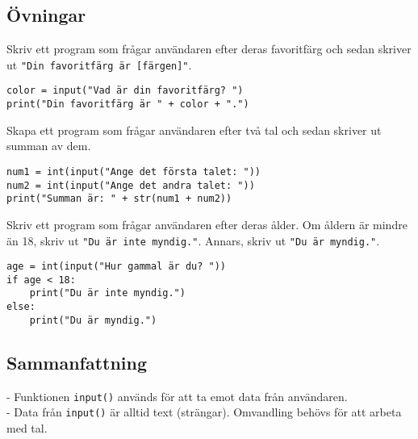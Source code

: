 \subsection{Övningar}
\begin{exercise}
Skriv ett program som frågar användaren efter deras favoritfärg och sedan skriver ut \texttt{"Din favoritfärg är [färgen]"}. 
\end{exercise}

\begin{solution}
\begin{lstlisting}
color = input("Vad är din favoritfärg? ")
print("Din favoritfärg är " + color + ".")
\end{lstlisting}
\end{solution}

\begin{exercise}
Skapa ett program som frågar användaren efter två tal och sedan skriver ut summan av dem.
\end{exercise}

\begin{solution}
\begin{lstlisting}
num1 = int(input("Ange det första talet: "))
num2 = int(input("Ange det andra talet: "))
print("Summan är: " + str(num1 + num2))
\end{lstlisting}
\end{solution}

\begin{exercise}
Skriv ett program som frågar användaren efter deras ålder. Om åldern är mindre än 18, skriv ut \texttt{"Du är inte myndig."}. Annars, skriv ut \texttt{"Du är myndig."}.
\end{exercise}

\begin{solution}
\begin{lstlisting}
age = int(input("Hur gammal är du? "))
if age < 18:
    print("Du är inte myndig.")
else:
    print("Du är myndig.")
\end{lstlisting}
\end{solution}

\subsection{Sammanfattning}
- Funktionen \texttt{input()} används för att ta emot data från användaren.  \\
- Data från \texttt{input()} är alltid text (strängar). Omvandling behövs för att arbeta med tal.  \\

